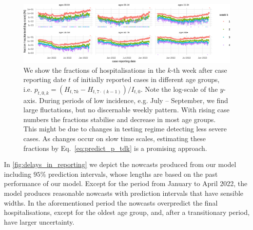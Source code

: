 \begin{figure}

    {\centering \includegraphics[width=\textwidth]{figures_tentative/hospitalisation_probabilities_over_time-1.pdf} 

}

\caption{We show the fractions of hospitalisations in the $k$-th week after case reporting date $t$  of initially reported cases in different age groups, i.e. $p_{t,0,k} = \left(H_{t,7 k} - H_{t, 7 \cdot (k - 1)}\right) / I_{t,0} $. Note the log-scale of the $y$-axis. During periods of low incidence, e.g. July -- September, we find large fluctations, but no discernable weekly pattern. With rising case numbers the fractions stabilise and decrease in most age groups. This might be due to changes in testing regime detecting less severe cases. As changes occur on slow time scales, estimating these fractions by Eq.~\eqref{eq:predict_p_tdk} is a promising approach.}\label{fig:hospitalisation_probabilities_over_time}
\end{figure}

In \cref{fig:delays_in_reporting} we depict the nowcasts produced
from our model including \(95\%\) prediction intervals, whose lengths
are based on the past performance of our model. Except for the period
from January to April 2022, the model produces reasonable nowcasts with
prediction intervals that have sensible widths. In the aforementioned
period the nowcasts overpredict the final hospitalisations, except for
the oldest age group, and, after a transitionary period, have larger
uncertainty.

